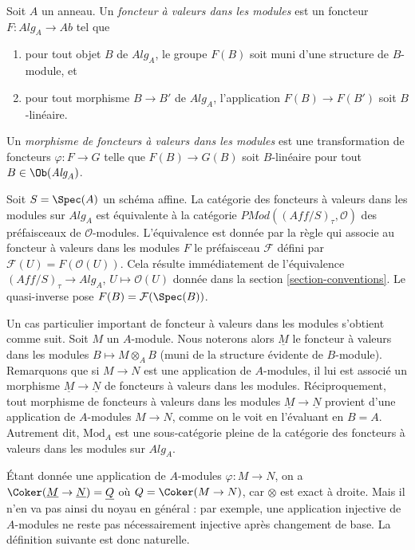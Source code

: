 \begin{definition}
\label{definition-module-valued-functor}
Soit $A$ un anneau. Un {\it foncteur à valeurs dans les modules} est un foncteur
$F : \textit{Alg}_A \to \textit{Ab}$ tel que
\begin{enumerate}
\item pour tout objet $B$ de $\textit{Alg}_A$, le groupe
$F(B)$ soit muni d'une structure de $B$-module, et
\item pour tout morphisme $B \to B'$ de $\textit{Alg}_A$, l'application
$F(B) \to F(B')$ soit $B$-linéaire.
\end{enumerate}
Un {\it morphisme de foncteurs à valeurs dans les modules} est une transformation
de foncteurs $\varphi : F \to G$ telle que $F(B) \to G(B)$ soit $B$-linéaire
pour tout $B \in \Ob(\textit{Alg}_A)$.
\end{definition}

\noindent
Soit $S = \Spec(A)$ un schéma affine.
La catégorie des foncteurs à valeurs dans les modules sur $\textit{Alg}_A$
est équivalente à la catégorie
$\textit{PMod}((\textit{Aff}/S)_\tau, \mathcal{O})$
des préfaisceaux de $\mathcal{O}$-modules. L'équivalence est donnée
par la règle qui associe au foncteur à valeurs dans les modules $F$ le
préfaisceau $\mathcal{F}$ défini par
$\mathcal{F}(U) = F(\mathcal{O}(U))$.
Cela résulte immédiatement de l'équivalence
$(\textit{Aff}/S)_\tau \to \textit{Alg}_A$, $U \mapsto \mathcal{O}(U)$
donnée dans la section \ref{section-conventions}.
Le quasi-inverse pose $F(B) = \mathcal{F}(\Spec(B))$.

\medskip\noindent
Un cas particulier important de foncteur à valeurs dans les modules
s'obtient comme suit. Soit $M$ un $A$-module. Nous noterons alors
$\underline{M}$ le foncteur à valeurs dans les modules $B \mapsto M \otimes_A B$
(muni de la structure évidente de $B$-module). Remarquons que si $M \to N$
est une application de $A$-modules, il lui est associé un morphisme
$\underline{M} \to \underline{N}$ de foncteurs à valeurs dans les modules.
Réciproquement, tout morphisme de foncteurs à valeurs dans les modules
$\underline{M} \to \underline{N}$ provient d'une application de $A$-modules
$M \to N$, comme on le voit en l'évaluant en $B = A$. Autrement dit,
$\text{Mod}_A$ est une sous-catégorie pleine de la catégorie des foncteurs
à valeurs dans les modules sur $\textit{Alg}_A$.

\medskip\noindent
Étant donnée une application de $A$-modules $\varphi : M \to N$, on a
$\Coker(\underline{M} \to \underline{N}) =
\underline{Q}$ où $Q = \Coker(M \to N)$, car $\otimes$
est exact à droite. Mais il n'en va pas ainsi
du noyau en général : par exemple, une application injective de
$A$-modules ne reste pas nécessairement injective après changement de base.
La définition suivante est donc naturelle.

